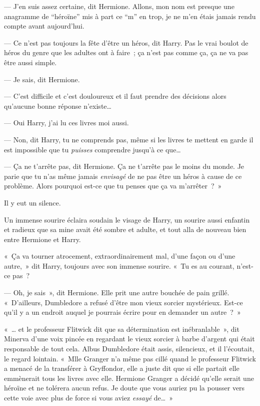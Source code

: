 --- J'en suis assez certaine, dit Hermione.
Allons, mon nom est presque une anagramme de “héroïne” mis à part ce “m” en trop, je ne m'en étais jamais rendu compte avant aujourd'hui.

--- Ce n'est pas toujours la fête d'être un héros, dit Harry.
Pas le vrai boulot de héros du genre que les adultes ont à faire~; ça n'est pas comme ça, ça ne va pas être aussi simple.

--- Je sais, dit Hermione.

--- C'est difficile et c'est douloureux et il faut prendre des décisions alors qu'aucune bonne réponse n'existe…

--- Oui Harry, j'ai lu ces livres moi aussi.

--- Non, dit Harry, tu ne comprends pas, même si les livres te mettent en garde il est impossible que tu \emph{puisses} comprendre jusqu'à ce que…

--- Ça ne t'arrête pas, dit Hermione.
Ça ne t'arrête pas le moins du monde.
Je parie que tu n'as même jamais \emph{envisagé} de ne pas être un héros à cause de ce problème.
Alors pourquoi est-ce que tu penses que ça va m'arrêter~?~»

Il y eut un silence.

Un immense sourire éclaira soudain le visage de Harry, un sourire aussi enfantin et radieux que sa mine avait été sombre et adulte, et tout alla de nouveau bien entre Hermione et Harry.

«~Ça va tourner atrocement, extraordinairement mal, d'une façon ou d'une autre,~» dit Harry, toujours avec son immense sourire.
«~Tu es au courant, n'est-ce pas~?

--- Oh, je sais~», dit Hermione.
Elle prit une autre bouchée de pain grillé.
«~D'ailleurs, Dumbledore a refusé d'être mon vieux sorcier mystérieux.
Est-ce qu'il y a un endroit auquel je pourrais écrire pour en demander un autre~?~»


«~… et le professeur Flitwick dit que sa détermination est inébranlable~», dit Minerva d'une voix pincée en regardant le vieux sorcier à barbe d'argent qui était responsable de tout cela.
Albus Dumbledore était assis, silencieux, et il l'écoutait, le regard lointain.
«~Mlle Granger n'a même pas cillé quand le professeur Flitwick a menacé de la transférer à Gryffondor, elle a juste dit que si elle partait elle emmènerait tous les livres avec elle.
Hermione Granger a décidé qu'elle serait une héroïne et ne tolérera aucun refus.
Je doute que vous auriez pu la pousser vers cette voie avec plus de force si vous aviez \emph{essayé} de…~»

